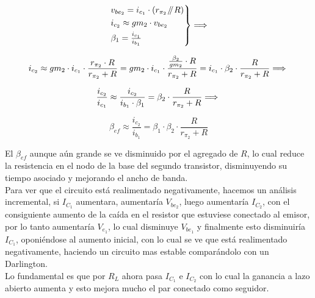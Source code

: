 \begin{equation}
\begin{rcases*}v_{be_{2}} = i_{c_{1}} \cdot (r_{\pi_{2}} \parallelresistors R) \\ i_{c_{2}} \approx gm_{2} \cdot v_{be_{2}} \\ \beta_{1} = \frac{i_{c_{1}}}{i_{b_{1}}}\end{rcases*} \Longrightarrow 
\end{equation}
 

\begin{equation}
i_{c_{2}} \approx gm_{2} \cdot i_{c_{1}} \cdot \frac{r_{\pi_{2}} \cdot R}{r_{\pi_{2} }+ R} = gm_{2} \cdot i_{c_{1}} \cdot \frac{ \frac{\beta_{2}}{gm_{2}} \cdot R}{r_{\pi_{2} }+ R} =
i_{c_{1}} \cdot \beta_{2} \cdot \frac{R}{r_{\pi_{2} }+ R} \Longrightarrow \\
\end{equation}
 

\begin{equation}
\frac{i_{c_{2}}}{i_{c_{1}}} \approx \frac{i_{c_{2}}}{i_{b_{1}} \cdot \beta_{1} }= \beta_{2} \cdot \frac{R}{r_{\pi_{2} }+ R}  \Longrightarrow \\
\end{equation}


\begin{equation}
\boxed{\beta_{ef} \approx \frac{i_{c_{2}}}{i_{b_{1}}} = \beta_{1} \cdot \beta_{2} \cdot \frac{R}{r_{\pi_{2} }+ R}}
\end{equation}


El $\beta_{ef}$ aunque aún grande se ve disminuido por el agregado de $R$, lo cual reduce la resistencia en el nodo de la base del segundo transistor, disminuyendo su tiempo asociado y mejorando el ancho de banda.\\

Para ver que el circuito está realimentado negativamente, hacemos un análisis incremental, si $I_{C_{1}}$ aumentara, aumentaría $V_{be_{2}}$, luego aumentaría $I_{C_{2}}$, con el consiguiente aumento de la caída en el resistor que estuviese conectado al emisor, por lo tanto aumentaría $V_{e_{1}}$, lo cual disminuye $V_{be_{1}}$ y finalmente esto disminuiría $I_{C_{1}}$, oponiéndose al aumento inicial, con lo cual se ve que está realimentado negativamente, haciendo un circuito mas estable comparándolo con un Darlington. \\
Lo fundamental es que por $R_{L}$ ahora pasa $I_{C_{1}}$ e $I_{C_{2}}$ con lo cual la ganancia a lazo abierto aumenta y esto mejora mucho el par conectado como seguidor.


